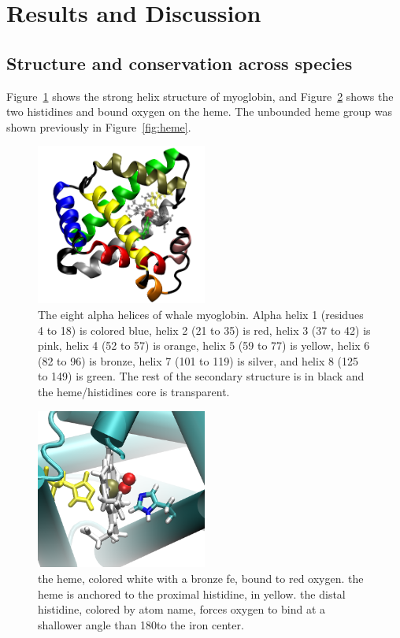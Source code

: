 \documentclass{article}
\begin{document}
\section{Results and Discussion}

\subsection{Structure and conservation across species}

Figure~\ref{fig:alpha_helices} shows the strong helix structure of myoglobin, and Figure~\ref{fig:histidines} shows the two histidines and bound oxygen on the heme.  The unbounded heme group was shown previously in Figure~\ref{fig:heme}.

\begin{figure}[!b]
	\centering
	\includegraphics[width=0.5\textwidth]{alpha_helices.png}
	\caption{The eight alpha helices of whale myoglobin.  Alpha helix 1 (residues 4 to 18) is colored blue, helix 2 (21 to 35) is red, helix 3 (37 to 42) is pink, helix 4 (52 to 57) is orange, helix 5 (59 to 77) is yellow, helix 6 (82 to 96) is bronze, helix 7 (101 to 119) is silver, and helix 8 (125 to 149) is green.  The rest of the secondary structure is in black and the heme/histidines core is transparent.}
	\label{fig:alpha_helices}
\end{figure}

\begin{figure}
	\centering
	\includegraphics[width=0.5\textwidth]{histidines.png}
	\caption{the heme, colored white with a bronze fe, bound to red oxygen.  the heme is anchored to the proximal histidine, in yellow.  the distal histidine, colored by atom name, forces oxygen to bind at a shallower angle than 180\textdegree to the iron center.}
	\label{fig:histidines}
\end{figure}
\end{document}
